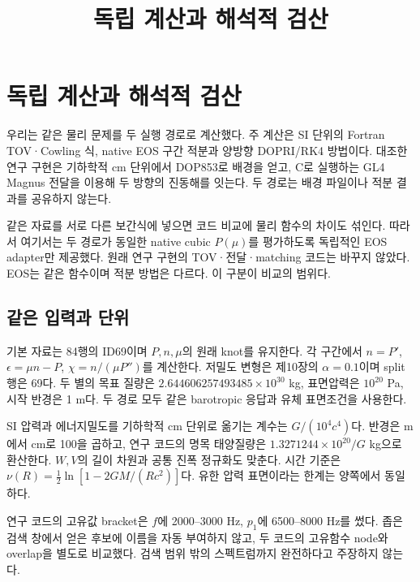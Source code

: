 \documentclass[
  10pt,
  a4paper,
]{article}
\title{독립 계산과 해석적 검산}
\author{}
\date{}
\begin{document}
\maketitle

{
\hypersetup{linkcolor=}
\setcounter{tocdepth}{3}
\tableofcontents
}
\section{독립 계산과 해석적
검산}\label{uxb3c5uxb9bd-uxacc4uxc0b0uxacfc-uxd574uxc11duxc801-uxac80uxc0b0}

우리는 같은 물리 문제를 두 실행 경로로 계산했다. 주 계산은 SI 단위의
Fortran TOV·Cowling 식, native EOS 구간 적분과 양방향 DOPRI/RK4
방법이다. 대조한 연구 구현은 기하학적 cm 단위에서 DOP853로 배경을 얻고,
C로 실행하는 GL4 Magnus 전달을 이용해 두 방향의 진동해를 잇는다. 두
경로는 배경 파일이나 적분 결과를 공유하지 않는다.

같은 자료를 서로 다른 보간식에 넣으면 코드 비교에 물리 함수의 차이도
섞인다. 따라서 여기서는 두 경로가 동일한 native cubic \(P(\mu)\)를
평가하도록 독립적인 EOS adapter만 제공했다. 원래 연구 구현의
TOV·전달·matching 코드는 바꾸지 않았다. EOS는 같은 함수이며 적분 방법은
다르다. 이 구분이 비교의 범위다.

\subsection{같은 입력과
단위}\label{uxac19uxc740-uxc785uxb825uxacfc-uxb2e8uxc704}

기본 자료는 84행의 ID69이며 \(P,n,\mu\)의 원래 knot를 유지한다. 각
구간에서 \(n=P'\), \(\epsilon=\mu n-P\), \(\chi=n/(\mu P'')\)를
계산한다. 저밀도 변형은 제10장의 \(\alpha=0.1\)이며 split 행은 69다. 두
별의 목표 질량은 \(2.644606257493485\times10^{30}\) kg, 표면압력은
\(10^{20}\) Pa, 시작 반경은 1 m다. 두 경로 모두 같은 barotropic 응답과
유체 표면조건을 사용한다.

SI 압력과 에너지밀도를 기하학적 cm 단위로 옮기는 계수는
\(G/(10^4c^4)\)다. 반경은 m에서 cm로 100을 곱하고, 연구 코드의 명목
태양질량은 \(1.3271244\times10^{20}/G\) kg으로 환산한다. \(W,V\)의 길이
차원과 공통 진폭 정규화도 맞춘다. 시간 기준은
\(\nu(R)=\tfrac12\ln[1-2GM/(Rc^2)]\)다. 유한 압력 표면이라는 한계는
양쪽에서 동일하다.

연구 코드의 고유값 bracket은 \(f\)에 2000--3000 Hz, \(p_1\)에 6500--8000
Hz를 썼다. 좁은 검색 창에서 얻은 후보에 이름을 자동 부여하지 않고, 두
코드의 고유함수 node와 overlap을 별도로 비교했다. 검색 범위 밖의
스펙트럼까지 완전하다고 주장하지 않는다.
\end{document}
